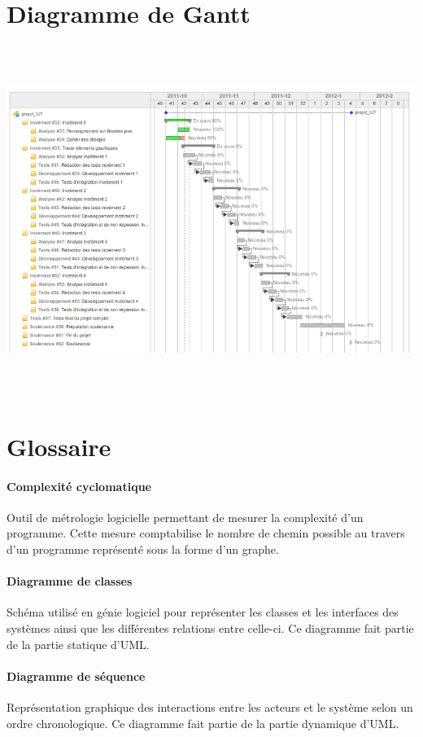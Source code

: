 \documentclass[12pt,a4paper,openany]{article}
\begin{document}
\section{Diagramme de Gantt}
\label{gantt}
\hspace{20px}
\vspace{-330px}
\includegraphics[height=430px, angle=-90]{projetiut-gantt.png}

\section{Glossaire}
	\paragraph{Complexité cyclomatique} Outil de métrologie logicielle permettant de mesurer la complexité d'un programme. Cette mesure comptabilise le nombre de chemin possible au travers d'un programme représenté sous la forme d'un graphe.
	\paragraph{Diagramme de classes} Schéma utilisé en génie logiciel pour représenter les classes et les interfaces des systèmes
	ainsi que les différentes relations entre celle-ci. Ce diagramme fait partie de la partie statique d'UML.
	\paragraph{Diagramme de séquence} Représentation graphique des interactions entre les acteurs et le système selon un ordre 
	chronologique. Ce diagramme fait partie de la partie dynamique d'UML.
\end{document}
